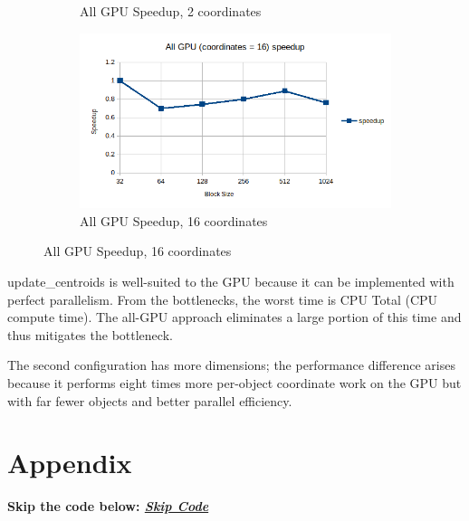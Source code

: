 \documentclass{article}
\newcommand{\eng}[1]{#1}
\begin{document}
\begin{figure}[h]
\begin{subfigure}{0.45\textwidth}
        \caption{\eng{All GPU Speedup}, 2 coordinates}
        \label{fig:all-gpu-2-speedup}
    \end{subfigure}
    \begin{subfigure}{0.45\textwidth}
        \includegraphics[width=\textwidth]{a4/plots/all_gpu_16_speedup.png}
        \caption{\eng{All GPU Speedup}, 16 coordinates}
        \label{fig:all-gpu-16-speedup}
    \end{subfigure}
\end{figure}
\FloatBarrier

\eng{update\_centroids} is well-suited to the GPU because it can be implemented with perfect parallelism. From the bottlenecks, the worst time is \eng{CPU Total} (CPU compute time). The all-GPU approach eliminates a large portion of this time and thus mitigates the bottleneck.

The second configuration has more dimensions; the performance difference arises because it performs eight times more per-object coordinate work on the GPU but with far fewer objects and better parallel efficiency.

\clearpage
\section{Appendix} %
\textbf{\eng{Skip} the code below: \hyperref[chapter_5]{\textit{\eng{Skip Code}}}}

\clearpage

\clearpage

\clearpage

\end{document}
